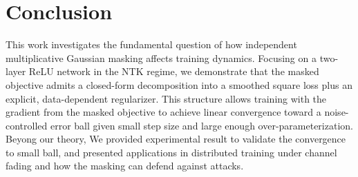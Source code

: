 \documentclass[10pt]{article} %
\theoremstyle{definition}
\theoremstyle{plain}
\begin{document}

\section{Conclusion}
\label{sec:conclusion}

This work investigates the fundamental question of how independent multiplicative Gaussian masking affects training dynamics. Focusing on a two-layer ReLU network in the NTK regime, we demonstrate that the masked objective admits a closed-form decomposition into a smoothed square loss plus an explicit, data-dependent regularizer. This structure allows training with the gradient from the masked objective to achieve linear convergence toward a noise-controlled error ball given small step size and large enough over-parameterization. Beyong our theory, We provided experimental result to validate the convergence to small ball, and presented applications in distributed training under channel fading and how the masking can defend against attacks. 
\end{document}
